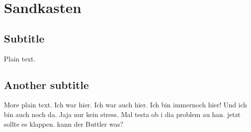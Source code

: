 \documentclass{article}
\begin{document}
\section{Sandkasten}

\subsection{Subtitle}

Plain text.
\subsection{Another subtitle}

More plain text.
Ich war hier.
Ich war auch hier.
Ich bin immernoch hier!
Und ich bin auch noch da.
Jaja nur kein stress.
Mal testa ob i dia problem au han.
jetzt sollte es klappen.
kann der Buttler was?
\end{document}

